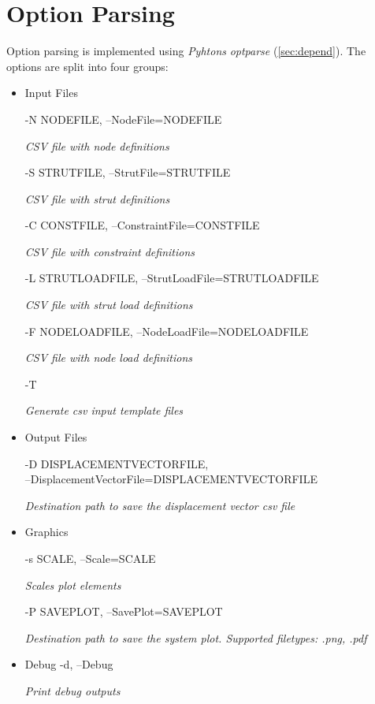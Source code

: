 \section{Option Parsing}
\label{sec:optparse}

Option parsing is implemented using \textit{Pyhtons} \textit{optparse} (\cref{sec:depend}). The options are split into four groups:

\begin{itemize}
\item Input Files

-N NODEFILE, --NodeFile=NODEFILE

\textit{CSV file with node definitions}

-S STRUTFILE, --StrutFile=STRUTFILE

\textit{CSV file with strut definitions}

-C CONSTFILE, --ConstraintFile=CONSTFILE

\textit{CSV file with constraint definitions}

-L STRUTLOADFILE, --StrutLoadFile=STRUTLOADFILE

\textit{CSV file with strut load definitions}

-F NODELOADFILE, --NodeLoadFile=NODELOADFILE

\textit{CSV file with node load definitions}

-T 

\textit{Generate csv input template files}

\item Output Files

-D DISPLACEMENTVECTORFILE,\\
--DisplacementVectorFile=DISPLACEMENTVECTORFILE 

\textit{Destination path to save the displacement vector csv file}

\item Graphics

-s SCALE, --Scale=SCALE

\textit{Scales plot elements}

-P SAVEPLOT, --SavePlot=SAVEPLOT

\textit{Destination path to save the system plot. Supported filetypes: .png, .pdf}

\item Debug
-d, --Debug

\textit{Print debug outputs}
\end{itemize}

